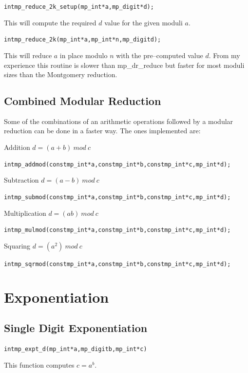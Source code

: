\documentclass[synpaper]{book}
\def\mod{{\mathit\ mod\ }}
\begin{document}
\begin{alltt}
int mp_reduce_2k_setup(mp_int *a, mp_digit *d);
\end{alltt}

This will compute the required $d$ value for the given moduli $a$.

\begin{alltt}
int mp_reduce_2k(mp_int *a, mp_int *n, mp_digit d);
\end{alltt}

This will reduce $a$ in place modulo $n$ with the pre--computed value $d$.  From my experience this routine is
slower than mp\_dr\_reduce but faster for most moduli sizes than the Montgomery reduction.

\section{Combined Modular Reduction}

Some of the combinations of an arithmetic operations followed by a modular reduction can be done in a faster way. The ones implemented are:

Addition $d = (a + b) \mod c$
\begin{alltt}
int mp_addmod(const mp_int *a, const mp_int *b, const mp_int *c, mp_int *d);
\end{alltt}

Subtraction  $d = (a - b) \mod c$
\begin{alltt}
int mp_submod(const mp_int *a, const mp_int *b, const mp_int *c, mp_int *d);
\end{alltt}

Multiplication $d = (ab) \mod c$
\begin{alltt}
int mp_mulmod(const mp_int *a, const mp_int *b, const mp_int *c, mp_int *d);
\end{alltt}

Squaring  $d = (a^2) \mod c$
\begin{alltt}
int mp_sqrmod(const mp_int *a, const mp_int *b, const mp_int *c, mp_int *d);
\end{alltt}

\chapter{Exponentiation}
\section{Single Digit Exponentiation}
\begin{alltt}
int mp_expt_d (mp_int * a, mp_digit b, mp_int * c)
\end{alltt}
This function computes $c = a^b$.
\end{document}
